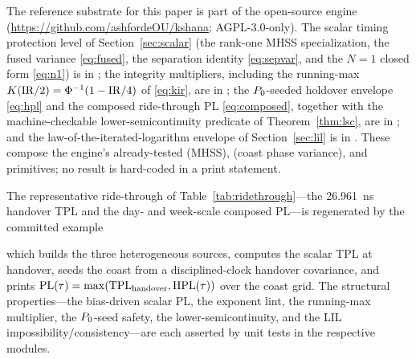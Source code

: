 \label{sec:availability}
The reference substrate for this paper is part of the open-source 
engine \citep{baweja2026kshana} (\url{https://github.com/ashfordeOU/kshana};
AGPL-3.0-only). The scalar timing protection level of Section~\ref{sec:scalar}
(the rank-one MHSS specialization, the fused variance \eqref{eq:fused}, the
separation identity \eqref{eq:sepvar}, and the $N=1$ closed form \eqref{eq:n1}) is
in ; the integrity multipliers, including the
running-max $K(\mathrm{IR}/2)=\Phi^{-1}(1-\mathrm{IR}/4)$ of \eqref{eq:kir}, are in
; the $P_0$-seeded holdover envelope \eqref{eq:hpl}
and the composed ride-through PL \eqref{eq:composed}, together with the
machine-checkable lower-semicontinuity predicate of Theorem~\ref{thm:lsc}, are in
; and the law-of-the-iterated-logarithm
envelope of Section~\ref{sec:lil} is in .
These compose the engine's already-tested  (MHSS), 
(coast phase variance), and  primitives; no result is
hard-coded in a print statement.

The representative ride-through of Table~\ref{tab:ridethrough}---the
\SI{26.961}{\nano\second} handover TPL and the day- and week-scale composed
PL---is regenerated by the committed example
\begin{quote}
\end{quote}
which builds the three heterogeneous sources, computes the scalar TPL at handover,
seeds the coast from a disciplined-clock handover covariance, and prints
$\mathrm{PL}(\tau)=\max(\mathrm{TPL}_{\mathrm{handover}},\mathrm{HPL}(\tau))$ over the coast grid. The
\Proven{} structural properties---the bias-driven scalar PL, the exponent lint,
the running-max multiplier, the $P_0$-seed safety, the lower-semicontinuity, and
the LIL impossibility/consistency---are each asserted by unit tests in the
respective modules.

